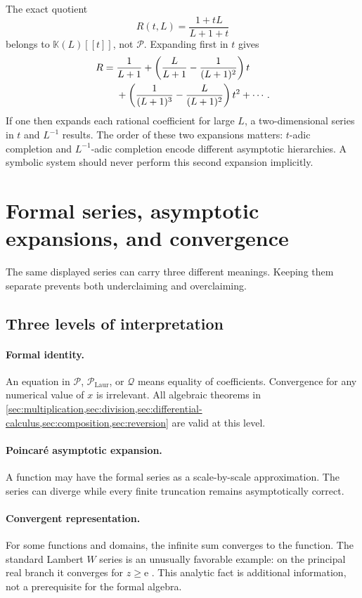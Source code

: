 \documentclass[11pt]{article}
\theoremstyle{pltheorem}
\newcommand{\K}{\mathbb K}
\newcommand{\PL}{\mathscr P}
\newcommand{\PLL}{\mathscr P_{\mathrm{Laur}}}
\newcommand{\QPL}{\mathscr Q}
\newcommand{\e}{\mathrm e}
\begin{document}
The exact quotient
\begin{equation}\label{eq:rational-log-example}
 R(t,L)=\frac{1+tL}{L+1+t}
\end{equation}
belongs to \(\K(L)[[t]]\), not \(\PL\).  Expanding first in \(t\) gives
\begin{align}
 R={}&\frac1{L+1}
 +\left(\frac{L}{L+1}-\frac1{(L+1)^2}\right)t
 \notag\\
 &+\left(\frac1{(L+1)^3}-\frac{L}{(L+1)^2}\right)t^2+\cdots.
 \label{eq:rational-log-t-expansion}
\end{align}
If one then expands each rational coefficient for large \(L\), a two-dimensional series in \(t\) and \(L^{-1}\) results.  The order of these two expansions matters: \(t\)-adic completion and \(L^{-1}\)-adic completion encode different asymptotic hierarchies.  A symbolic system should never perform this second expansion implicitly.

\section{Formal series, asymptotic expansions, and convergence}
\label{sec:formal-analytic}

The same displayed series can carry three different meanings.  Keeping them separate prevents both underclaiming and overclaiming.

\subsection{Three levels of interpretation}

\paragraph{Formal identity.}
An equation in \(\PL\), \(\PLL\), or \(\QPL\) means equality of coefficients.  Convergence for any numerical value of \(x\) is irrelevant.  All algebraic theorems in \cref{sec:multiplication,sec:division,sec:differential-calculus,sec:composition,sec:reversion} are valid at this level.

\paragraph{Poincar\'e asymptotic expansion.}
A function may have the formal series as a scale-by-scale approximation.  The series can diverge while every finite truncation remains asymptotically correct.

\paragraph{Convergent representation.}
For some functions and domains, the infinite sum converges to the function.  The standard Lambert \(W\) series is an unusually favorable example: on the principal real branch it converges for \(z\ge\e\) \cite{dlmf-W}.  This analytic fact is additional information, not a prerequisite for the formal algebra.
\end{document}
